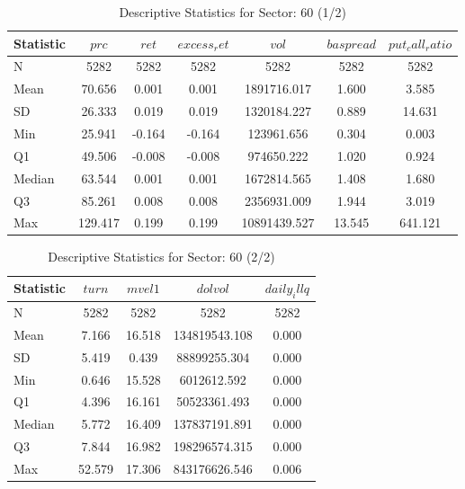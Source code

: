     \begin{table}[ht]
    \centering

    
    \caption{Descriptive Statistics for Sector: 60 (1/2)}
    \label{tab:sec60_a}
    
    \begin{tabular}{lcccccc}
    \toprule
    Statistic & $prc$ & $ret$ & $excess_ret$ & $vol$ & $baspread$ & $put_call_ratio$ \\\midrule
    N & 5282 & 5282 & 5282 & 5282 & 5282 & 5282 \\
    Mean & 70.656 & 0.001 & 0.001 & 1891716.017 & 1.600 & 3.585 \\
    SD & 26.333 & 0.019 & 0.019 & 1320184.227 & 0.889 & 14.631 \\
    Min & 25.941 & -0.164 & -0.164 & 123961.656 & 0.304 & 0.003 \\
    Q1 & 49.506 & -0.008 & -0.008 & 974650.222 & 1.020 & 0.924 \\
    Median & 63.544 & 0.001 & 0.001 & 1672814.565 & 1.408 & 1.680 \\
    Q3 & 85.261 & 0.008 & 0.008 & 2356931.009 & 1.944 & 3.019 \\
    Max & 129.417 & 0.199 & 0.199 & 10891439.527 & 13.545 & 641.121 \\
    \bottomrule
    \end{tabular}

    \end{table}
    
    \begin{table}[ht]
    \centering

    
    \caption{Descriptive Statistics for Sector: 60 (2/2)}
    \label{tab:sec60_b}
    
    \begin{tabular}{lcccc}
    \toprule
    Statistic & $turn$ & $mvel1$ & $dolvol$ & $daily_illq$ \\\midrule
    N & 5282 & 5282 & 5282 & 5282 \\
    Mean & 7.166 & 16.518 & 134819543.108 & 0.000 \\
    SD & 5.419 & 0.439 & 88899255.304 & 0.000 \\
    Min & 0.646 & 15.528 & 6012612.592 & 0.000 \\
    Q1 & 4.396 & 16.161 & 50523361.493 & 0.000 \\
    Median & 5.772 & 16.409 & 137837191.891 & 0.000 \\
    Q3 & 7.844 & 16.982 & 198296574.315 & 0.000 \\
    Max & 52.579 & 17.306 & 843176626.546 & 0.006 \\
    \bottomrule
    \end{tabular}

    \end{table}
    